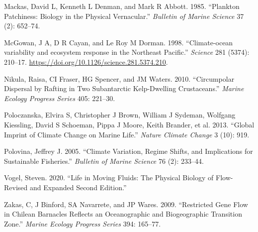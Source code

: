 \documentclass[
]{article}
\begin{document}
\leavevmode\hypertarget{ref-mackas1985}{}%
Mackas, David L, Kenneth L Denman, and Mark R Abbott. 1985. ``Plankton
Patchiness: Biology in the Physical Vernacular.'' \emph{Bulletin of
Marine Science} 37 (2): 652--74.

\leavevmode\hypertarget{ref-McGowan1998}{}%
McGowan, J A, D R Cayan, and Le Roy M Dorman. 1998. ``Climate-ocean
variability and ecosystem response in the Northeast Pacific.''
\emph{Science} 281 (5374): 210--17.
\url{https://doi.org/10.1126/science.281.5374.210}.

\leavevmode\hypertarget{ref-nikula2010}{}%
Nikula, Raisa, CI Fraser, HG Spencer, and JM Waters. 2010. ``Circumpolar
Dispersal by Rafting in Two Subantarctic Kelp-Dwelling Crustaceans.''
\emph{Marine Ecology Progress Series} 405: 221--30.

\leavevmode\hypertarget{ref-Poloczanska2013}{}%
Poloczanska, Elvira S, Christopher J Brown, William J Sydeman, Wolfgang
Kiessling, David S Schoeman, Pippa J Moore, Keith Brander, et al. 2013.
``Global Imprint of Climate Change on Marine Life.'' \emph{Nature
Climate Change} 3 (10): 919.

\leavevmode\hypertarget{ref-Polovina2005}{}%
Polovina, Jeffrey J. 2005. ``Climate Variation, Regime Shifts, and
Implications for Sustainable Fisheries.'' \emph{Bulletin of Marine
Science} 76 (2): 233--44.

\leavevmode\hypertarget{ref-Vogel2020}{}%
Vogel, Steven. 2020. ``Life in Moving Fluids: The Physical Biology of
Flow-Revised and Expanded Second Edition.''

\leavevmode\hypertarget{ref-zakas2009}{}%
Zakas, C, J Binford, SA Navarrete, and JP Wares. 2009. ``Restricted Gene
Flow in Chilean Barnacles Reflects an Oceanographic and Biogeographic
Transition Zone.'' \emph{Marine Ecology Progress Series} 394: 165--77.
\end{document}
